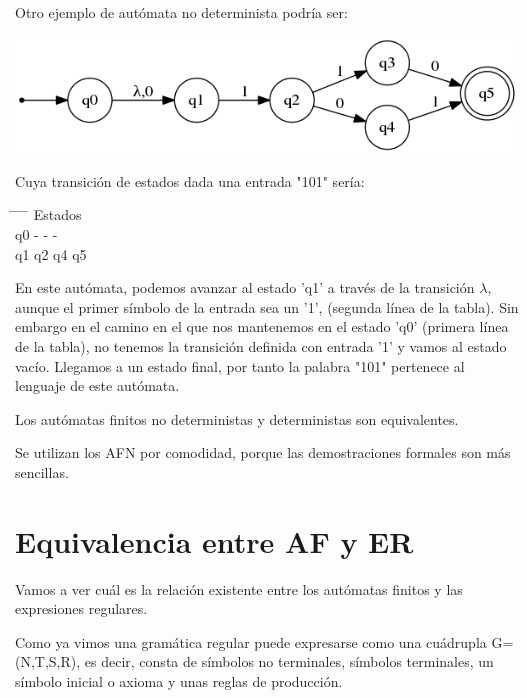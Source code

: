 \documentclass{apuntes}
\begin{document}
\begin{example}
Otro ejemplo de autómata no determinista podría ser:
\begin{center}
\includegraphics[scale=0.75]{automata3a.png}
\end{center}
Cuya transición de estados dada una entrada "101" sería:

 \begin{tabbing}
   \hspace*{2cm} \= \hspace*{2cm} \= \hspace*{2cm} \= \hspace*{2cm} \= \hspace*{2cm} \kill
 Estados          \\
 q0 \> - \> - \> -  \\
 q1 \> q2 \> q4 \> q5\\
 \end{tabbing}

En este autómata, podemos avanzar al estado 'q1'  a través de la transición $\lambda$, aunque el primer símbolo de la entrada sea un '1', (segunda línea de la tabla). Sin embargo en el camino en el que nos mantenemos en el estado 'q0'  (primera línea de la tabla), no tenemos la transición definida con entrada '1' y vamos al estado vacío. Llegamos a un estado final, por tanto la palabra "101" pertenece al lenguaje de este autómata.

\end{example}

\begin{theorem}
Los autómatas finitos no deterministas y deterministas son equivalentes.
\end{theorem}
Se utilizan los AFN por comodidad, porque las demostraciones formales son más sencillas.

\section{Equivalencia entre AF y ER}
Vamos a ver cuál es la relación existente entre los autómatas finitos y las expresiones regulares.

Como ya vimos una gramática regular puede expresarse como una cuádrupla G=(N,T,S,R), es decir, consta de símbolos no terminales, símbolos terminales, un símbolo inicial o axioma y unas reglas de producción.
\end{document}
